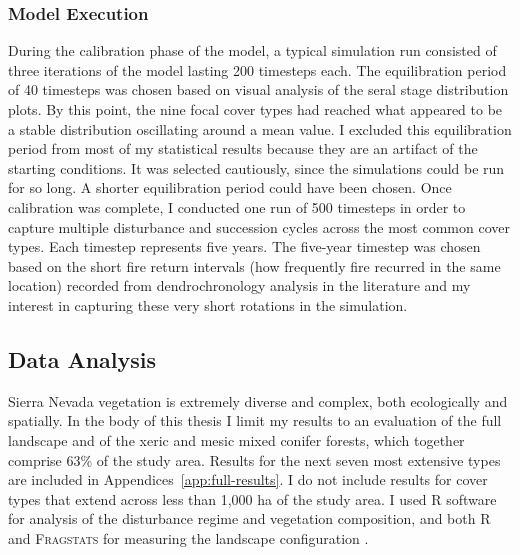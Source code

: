 


\subsubsection*{Model Execution}
During the calibration phase of the model, a typical simulation run consisted of three iterations of the model lasting 200 timesteps each. The equilibration period of 40 timesteps was chosen based on visual analysis of the seral stage distribution plots. By this point, the nine focal cover types had reached what appeared to be a stable distribution oscillating around a mean value. I excluded this equilibration period from most of my statistical results because they are an artifact of the starting conditions. It was selected cautiously, since the simulations could be run for so long. A shorter equilibration period could have been chosen. Once calibration was complete, I conducted one run of 500 timesteps in order to capture multiple disturbance and succession cycles across the most common cover types. Each timestep represents five years. The five-year timestep was chosen based on the short fire return intervals (how frequently fire recurred in the same location) recorded from dendrochronology analysis in the literature and my interest in capturing these very short rotations in the simulation.

\subsection{Data Analysis}
\label{subsec:dataanalysis}

Sierra Nevada vegetation is extremely diverse and complex, both ecologically and spatially. In the body of this thesis I limit my results to an evaluation of the full landscape and of the xeric and mesic mixed conifer forests, which together comprise 63\% of the study area. Results for the next seven most extensive types are included in Appendices~\ref{app:full-results}. I do not include results for cover types that extend across less than 1,000 ha of the study area. I used R software for analysis of the disturbance regime and vegetation composition, and both R and \textsc{Fragstats} for measuring the landscape configuration \citep{RCoreTeam2013,Fragstats2012}.

